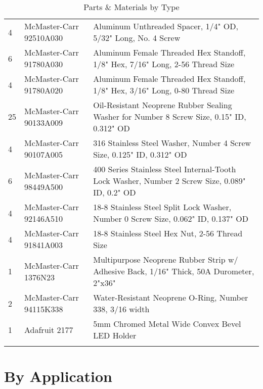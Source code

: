 \begin{longtabu}{X[1,c,m] X[6,c,m] X[9,l,m]}
  4 & McMaster-Carr 92510A030 & Aluminum Unthreaded Spacer, 1/4" OD, 5/32" Long, No. 4 Screw \\
  6 & McMaster-Carr 91780A030 & Aluminum Female Threaded Hex Standoff, 1/8" Hex, 7/16" Long, 2-56 Thread Size \\
  4 & McMaster-Carr 91780A020 & Aluminum Female Threaded Hex Standoff, 1/8" Hex, 3/16" Long, 0-80 Thread Size \\

  25 & McMaster-Carr 90133A009 & Oil-Resistant Neoprene Rubber Sealing Washer for Number 8 Screw Size, 0.15" ID, 0.312" OD \\
  4 & McMaster-Carr 90107A005 & 316 Stainless Steel Washer, Number 4 Screw Size, 0.125" ID, 0.312" OD \\
  6 & McMaster-Carr 98449A500 & 400 Series Stainless Steel Internal-Tooth Lock Washer, Number 2 Screw Size, 0.089" ID, 0.2" OD \\
  4 & McMaster-Carr 92146A510 & 18-8 Stainless Steel Split Lock Washer, Number 0 Screw Size, 0.062" ID, 0.137" OD \\

  4 & McMaster-Carr 91841A003 & 18-8 Stainless Steel Hex Nut, 2-56 Thread Size \\

  1 & McMaster-Carr 1376N23 & Multipurpose Neoprene Rubber Strip w/ Adhesive Back, 1/16" Thick, 50A Durometer, 2"x36" \\
  2 & McMaster-Carr 94115K338 & Water-Resistant Neoprene O-Ring, Number 338, 3/16 width \\
  1 & Adafruit 2177 & 5mm Chromed Metal Wide Convex Bevel LED Holder \\

  \bhrule
\caption{Parts \& Materials by Type}
\end{longtabu}

\pagebreak
\section{By Application}

